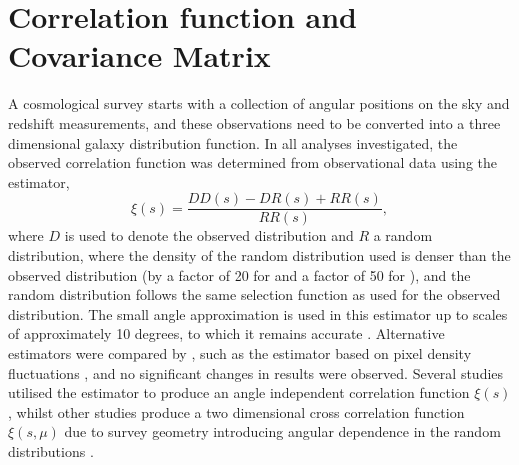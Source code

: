 \documentclass[titlesmallcaps, examinerscopy, copyrightpage]{uqthesis}
\begin{document}
\section{Correlation function and Covariance Matrix}

A cosmological survey starts with a collection of angular positions on the sky and redshift measurements, and these observations need to be converted into a three dimensional galaxy distribution function.
In all analyses investigated, the observed correlation function was determined from observational data using the \citet{LandySzalay1993} estimator,
\begin{equation}
\xi(s) = \frac{DD(s) - DR(s) + RR(s)}{RR(s)},
\end{equation}
where $D$ is used to denote the observed distribution and $R$ a random distribution, where the density of the random distribution used is denser than the observed distribution (by a factor of 20 for \citet{Gaztanaga2009} and a factor of 50 for \citet{SanchezScoccola2012}), and the random distribution follows the same selection function as used for the observed distribution. The small angle approximation is used in this estimator up to scales of approximately 10 degrees, to which it remains accurate \citep{Szapudi2004, Matsubara2000Correlation}. Alternative estimators were compared by \citet{Gaztanaga2009}, such as the estimator based on pixel density fluctuations \citep{BarrigaGaztanaga2002}, and no significant changes in results were observed. Several studies utilised the \citet{LandySzalay1993} estimator to produce an angle independent correlation function $\xi(s)$ \citep{BlakeDavis2011, ChuangWang2012}, whilst other studies produce a two dimensional cross correlation function $\xi(s,\mu)$ due to survey geometry introducing angular dependence in the random distributions \citep{SanchezScoccola2012, SamushiaPercivalGuzzo2011, KazinSanchezBlanton2012}.\\
\end{document}
